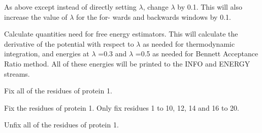 \documentclass[letterpaper,10pt,english]{sphinxmanual}
\begin{document}
As above except instead of directly setting \(\lambda\), change \(\lambda\) by 0.1. This will also increase the value of \(\lambda\) for the for- wards and backwards windows by 0.1.

\ignorespaces 
\def\sphinxLiteralBlockLabel{\label{\detokenize{protoms:index-87}}}
%
\begin{sphinxVerbatim}[commandchars=\\\{\}]
   
\end{sphinxVerbatim}

Calculate quantities need for free energy estimators. This will calculate the derivative of the potential with respect to \(\lambda\) as needed for thermodynamic integration, and energies at \(\lambda\) =0.3 and \(\lambda\) =0.5 as needed for Bennett Acceptance Ratio method. All of these energies will be printed to the INFO and ENERGY streams.

\ignorespaces 
\def\sphinxLiteralBlockLabel{\label{\detokenize{protoms:index-88}}}
%
\begin{sphinxVerbatim}[commandchars=\\\{\}]
   
\end{sphinxVerbatim}

Fix all of the residues of protein 1.

%
\begin{sphinxVerbatim}[commandchars=\\\{\}]
      
\end{sphinxVerbatim}

Fix the residues of protein 1. Only fix residues 1 to 10, 12, 14 and 16 to 20.

%
\begin{sphinxVerbatim}[commandchars=\\\{\}]
   
\end{sphinxVerbatim}

Unfix all of the residues of protein 1.

\ignorespaces 
\def\sphinxLiteralBlockLabel{\label{\detokenize{protoms:index-89}}}
%
\begin{sphinxVerbatim}[commandchars=\\\{\}]
   
\end{sphinxVerbatim}
\end{document}
